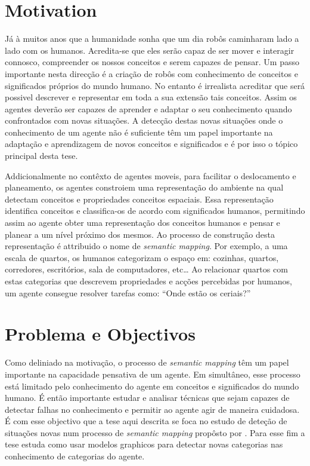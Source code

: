 \documentclass[9pt,a4paper]{extarticle}
\begin{document}
\begin{multicols}{2}

\section{Motivation}
Já à muitos anos que a humanidade sonha que um dia robôs caminharam lado a lado com os humanos.
Acredita-se que eles serão capaz de ser mover e interagir connosco, compreender os nossos conceitos
e serem capazes de pensar.
Um passo importante nesta direcção é a criação de robôs com conhecimento de conceitos e significados
próprios do mundo humano.
No entanto é irrealista acreditar que será possivel descrever e representar em toda a sua extensão
tais conceitos. Assim os agentes deverão ser capazes de aprender e adaptar o seu conhecimento quando
confrontados com novas situações.
A detecção destas novas situações onde o conhecimento de um agente não é suficiente têm um papel importante
na adaptação e aprendizagem de novos conceitos e significados e é por isso o tópico principal desta tese.

Addicionalmente no contêxto de agentes moveis, para facilitar o deslocamento e planeamento, os
agentes constroiem uma representação do ambiente na qual detectam conceitos e propriedades
conceitos espaciais.
Essa representação identifica conceitos e classifica-os de acordo com significados humanos,
permitindo assim ao agente obter uma representação dos conceitos humanos e pensar e planear a um
nível próximo dos mesmos.
Ao processo de construção desta representação é attribuido o nome de \emph{semantic mapping}.
Por exemplo, a uma escala de quartos, os humanos categorizam o espaço em: cozinhas, quartos, corredores,
escritórios, sala de computadores, etc\dots
Ao relacionar quartos com estas categorias que descrevem propriedades e acções percebidas por
humanos, um agente consegue resolver tarefas como: ``Onde estão os ceriais?''

\section{Problema e Objectivos}
Como deliniado na motivação, o processo de \emph{semantic mapping} têm um papel importante na
capacidade pensativa de um agente. Em simultâneo, esse processo está limitado pelo conhecimento
do agente em conceitos e significados do mundo humano. É então importante estudar e analisar
técnicas que sejam capazes de detectar falhas no conhecimento e permitir ao agente agir de maneira
cuidadosa.
É com esse objectivo que a tese aqui descrita se foca no estudo de deteção
de situações novas num processo de \emph{semantic mapping} propôsto por \cite{pronobis2011phd}.
Para esse fim a tese estuda como usar modelos graphicos para detectar novas categorias nas conhecimento
de categorias do agente.


\end{multicols}
\end{document}
